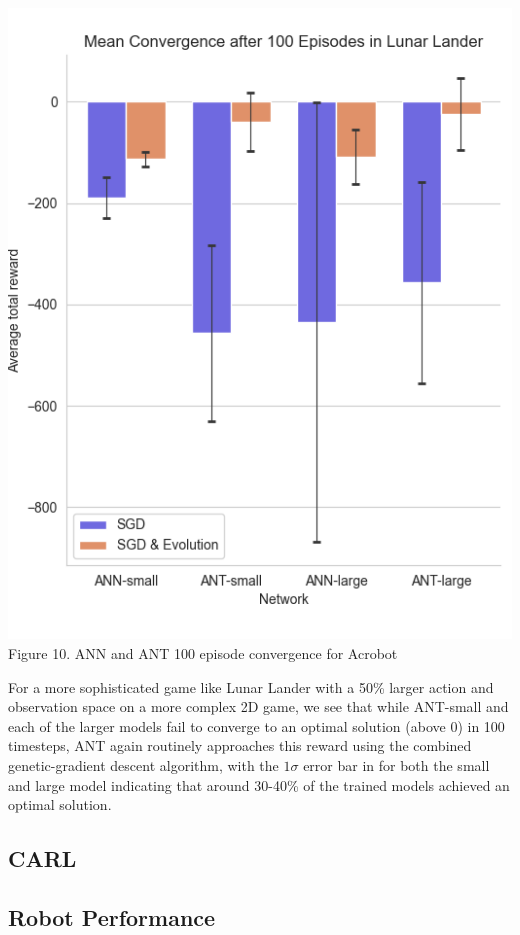 \documentclass{article}
\begin{document}
\begin{multicols}{2}
	\begin{center}
	\includegraphics[scale=0.6]{figs/lunarlander_convergence_resize.png}
	\small Figure 10. ANN and ANT 100 episode convergence for Acrobot
	\end{center}
	
	For a more sophisticated game like Lunar Lander with a 50\% larger action and observation space on a more complex 2D game, we see that while ANT-small and each of the larger models fail to converge to an optimal solution (above 0) in 100 timesteps, ANT again routinely approaches this reward using the combined genetic-gradient descent algorithm, with the $1\sigma$ error bar in for both the small and large model indicating that around 30-40\% of the trained models achieved an optimal solution.

	
	\subsection{CARL}
	
	\subsection{Robot Performance}
	

\end{multicols}
\end{document}
